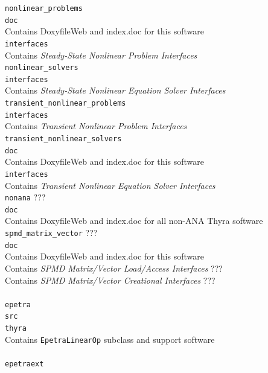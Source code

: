\documentclass[pdf,ps2pdf,11pt]{SANDreport}
\begin{document}
\>\>\>\>\texttt{nonlinear\_problems} \\
\>\>\>\>\>\texttt{doc}\\
\>\>\>\>\>\>Contains DoxyfileWeb and index.doc for this software \\
\>\>\>\>\>\texttt{interfaces} \\
\>\>\>\>\>\>Contains {}\textit{Steady-State Nonlinear Problem Interfaces} \\
\>\>\>\>\texttt{nonlinear\_solvers} \\
\>\>\>\>\>\texttt{interfaces} \\
\>\>\>\>\>\>Contains {}\textit{Steady-State Nonlinear Equation Solver Interfaces} \\
\>\>\>\>\texttt{transient\_nonlinear\_problems} \\
\>\>\>\>\>\texttt{interfaces} \\
\>\>\>\>\>\>Contains {}\textit{Transient Nonlinear Problem Interfaces} \\
\>\>\>\>\texttt{transient\_nonlinear\_solvers} \\
\>\>\>\>\>\texttt{doc}\\
\>\>\>\>\>\>Contains DoxyfileWeb and index.doc for this software \\
\>\>\>\>\>\texttt{interfaces} \\
\>\>\>\>\>\>Contains {}\textit{Transient Nonlinear Equation Solver Interfaces} \\
\>\>\>\texttt{nonana} ??? \\
\>\>\>\>\texttt{doc}\\
\>\>\>\>\>Contains DoxyfileWeb and index.doc for all non-ANA Thyra software \\
\>\>\>\>\texttt{spmd\_matrix\_vector} ??? \\
\>\>\>\>\>\texttt{doc}\\
\>\>\>\>\>\>Contains DoxyfileWeb and index.doc for this software \\
\>\>\>\>\>Contains {}\textit{SPMD Matrix/Vector Load/Access Interfaces} ??? \\
\>\>\>\>\>Contains {}\textit{SPMD Matrix/Vector Creational Interfaces} ??? \\
\\
\>\texttt{epetra} \\
\>\>\texttt{src} \\
\>\>\>\texttt{thyra} \\
\>\>\>\>Contains \texttt{EpetraLinearOp} subclass and support software \\
\\
\>\texttt{epetraext} \\
\end{document}

